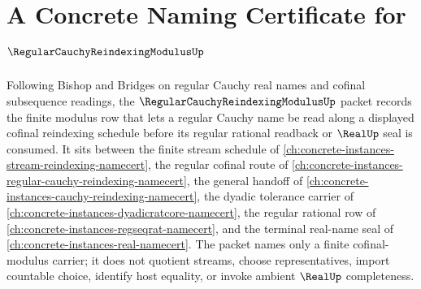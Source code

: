 \chapter{A Concrete Naming Certificate for $\RegularCauchyReindexingModulusUp$}
\label{ch:concrete-instances-regular-cauchy-reindexing-modulus-namecert}

Following Bishop and Bridges on regular Cauchy real names and cofinal subsequence readings, the $\RegularCauchyReindexingModulusUp$ packet records the finite modulus row that lets a regular Cauchy name be read along a displayed cofinal reindexing schedule before its regular rational readback or $\RealUp$ seal is consumed. It sits between the finite stream schedule of \autoref{ch:concrete-instances-stream-reindexing-namecert}, the regular cofinal route of \autoref{ch:concrete-instances-regular-cauchy-reindexing-namecert}, the general handoff of \autoref{ch:concrete-instances-cauchy-reindexing-namecert}, the dyadic tolerance carrier of \autoref{ch:concrete-instances-dyadicratcore-namecert}, the regular rational row of \autoref{ch:concrete-instances-regseqrat-namecert}, and the terminal real-name seal of \autoref{ch:concrete-instances-real-namecert}. The packet names only a finite cofinal-modulus carrier; it does not quotient streams, choose representatives, import countable choice, identify host equality, or invoke ambient $\RealUp$ completeness.

